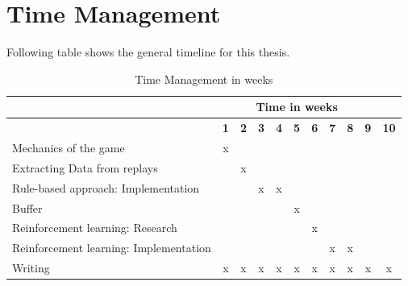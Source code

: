 \documentclass{article}
\begin{document}
\section{Time Management}
Following table shows the general timeline for this thesis. 
\begin{table}[ht]
    \centering
    \begin{tabular}{|l|c|c|c|c|c|c|c|c|c|c|}
    \hline
     & \multicolumn{9}{c}{Time in weeks}  & \\ \hline
     & \textbf{1} & \textbf{2} & \textbf{3} & \textbf{4} & \textbf{5} & \textbf{6} & \textbf{7} & \textbf{8} & \textbf{9} & \textbf{10} \\ \hline
    Mechanics of the game                       & x &   &   &   &   &   &   &   &   &   \\ \hline
    Extracting Data from replays                &   & x &   &   &   &   &   &   &   &   \\ \hline
    Rule-based approach: Implementation          &   &   & x & x &   &   &   &   &   &   \\ \hline
    Buffer                                      &   &   &   &   & x &   &   &   &   &   \\ \hline
    Reinforcement learning: Research            &   &   &   &   &   & x &   &   &   &   \\ \hline
    Reinforcement learning: Implementation      &   &   &   &   &   &   & x & x &   &   \\ \hline
    Writing                                     & x & x & x & x & x & x & x & x & x & x \\ \hline
    \end{tabular}
    \caption{Time Management in weeks}
\end{table}
\end{document}
